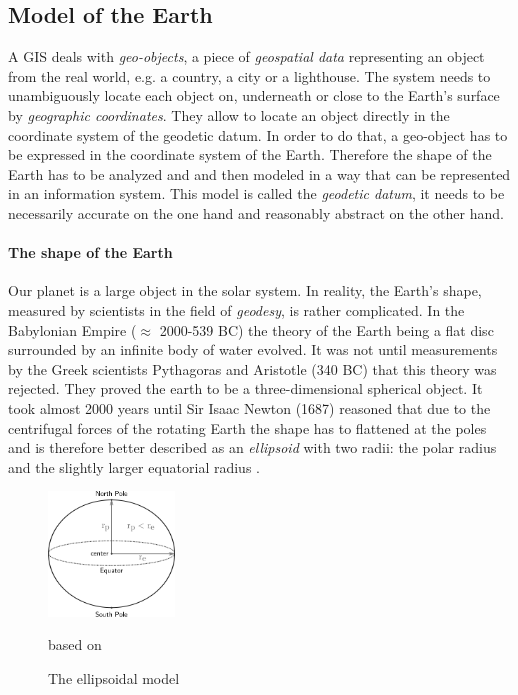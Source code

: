 

\subsection{Model of the Earth} %
\label{ssub:model_of_the_earth}

A GIS deals with \emph{geo-objects}, a piece of \emph{geospatial data} representing an object from the real world, e.g. a country, a city or a lighthouse. The system needs to unambiguously locate each object on, underneath or close to the Earth's surface by \emph{geographic coordinates}. They allow to locate an object directly in the coordinate system of the geodetic datum. In order to do that, a geo-object has to be expressed in the coordinate system of the Earth. Therefore the shape of the Earth has to be analyzed and and then modeled in a way that can be represented in an information system. This model is called the \emph{geodetic datum}, it needs to be necessarily accurate on the one hand and reasonably abstract on the other hand.


\paragraph{The shape of the Earth} %
\label{par:the_shape_of_the_earth}

Our planet is a large object in the solar system. In reality, the Earth's shape, measured by scientists in the field of \emph{geodesy}, is rather complicated. In the Babylonian Empire ($\approx$ 2000-539 BC) the theory of the Earth being a flat disc surrounded by an infinite body of water
evolved. It was not until measurements by the Greek scientists Pythagoras and Aristotle (340 BC) that this theory was rejected. They proved the earth to be a three-dimensional spherical object. It took almost 2000 years until Sir Isaac Newton (1687) reasoned that due to the centrifugal forces of the rotating Earth the shape has to flattened at the poles and is therefore better described as an \emph{ellipsoid} with two radii: the polar radius and the slightly larger equatorial radius
\cite[pp. 69-77]{bolstad2008gis}.

\begin{figure}[ht]
  \centering
  \includegraphics[width = 0.3\textwidth]{graphics/basics/ellipsoid}
  \caption{The ellipsoidal model}
  \small{based on \cite[Fig. 3-3, p. 72]{bolstad2008gis}}
  \label{fig:ellipsoid}
\end{figure}

